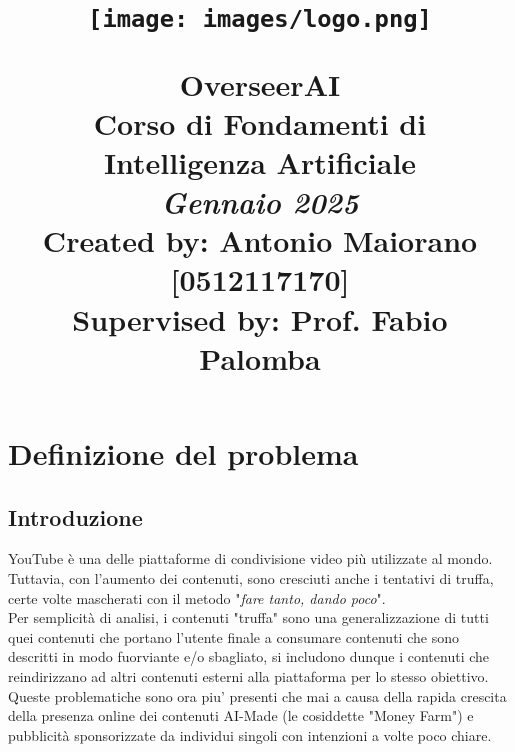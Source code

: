 \documentclass[a4paper,12pt]{report}
\title{
    \texttt{[image: images/logo.png]}
    \vspace{3cm} %
    
    \textbf{\Huge OverseerAI} \\
    \vspace{1cm} %
    \large Corso di Fondamenti di Intelligenza Artificiale \\
    \vspace{0.5cm} %
    \small \textit{Gennaio 2025} \\
    \vspace{3cm}
    \textbf{Created by: }{\large Antonio Maiorano [0512117170] \usefont{OT1}{ptm}{m}{n}\selectfont} \\
    \vspace{0.5cm}
    \textbf{Supervised by: }{\large Prof. Fabio Palomba}
}
\date{}
\begin{document}
\maketitle
\thispagestyle{empty}
\newpage

\renewcommand*\contentsname{\hfill Indice \hfill}
\setcounter{page}{1}  %
\tableofcontents
\newpage

\begingroup%
\makeatletter%
\let\clearpage\relax%
\vspace*{\fill}%
\vspace*{\dimexpr-50\p@-\baselineskip}%
\chapter{Definizione del problema}
\vspace*{\fill}%
\endgroup
\newpage


\section{Introduzione}
YouTube è una delle piattaforme di condivisione video più utilizzate al mondo. Tuttavia, con l'aumento dei contenuti, sono cresciuti anche i tentativi di truffa, certe volte mascherati con il metodo "\textit{fare tanto, dando poco}".\\
Per semplicità di analisi, i contenuti "truffa" sono una generalizzazione di tutti quei contenuti che portano l'utente finale a consumare contenuti che sono descritti in modo fuorviante e/o sbagliato, si includono dunque i contenuti che reindirizzano ad altri contenuti esterni alla piattaforma per lo stesso obiettivo.\\
Queste problematiche sono ora piu' presenti che mai a causa della rapida crescita della presenza online dei contenuti AI-Made (le cosiddette "Money Farm") e pubblicità sponsorizzate da individui singoli con intenzioni a volte poco chiare.
\end{document}
